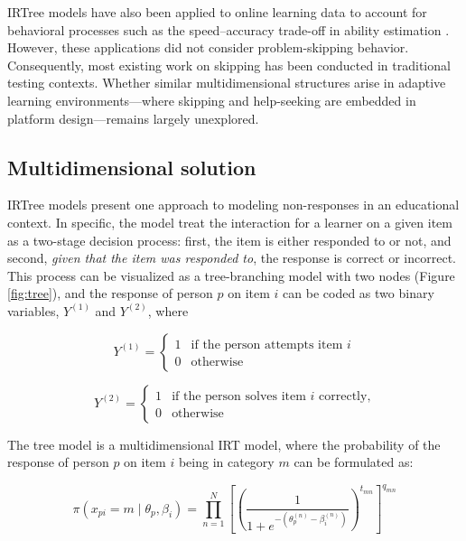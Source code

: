 \documentclass[12pt]{article}
\begin{document}
IRTree models have also been applied to online learning data to account for behavioral processes such as the speed–accuracy trade-off in ability estimation \parencite{coomans2016distinguishing, hofman2018fast}. However, these applications did not consider problem-skipping behavior. Consequently, most existing work on skipping has been conducted in traditional testing contexts. Whether similar multidimensional structures arise in adaptive learning environments---where skipping and help-seeking are embedded in platform design---remains largely unexplored. 

\subsection{Multidimensional solution}
IRTree models present one approach to modeling non-responses in an educational context. In specific, the model treat the interaction for a learner on a given item as a two-stage decision process: first, the item is either responded to or not, and second, \textit{given that the item was responded to}, the response is correct or incorrect. This process can be visualized as a tree-branching model with two nodes (Figure \ref{fig:tree}), and the response of person $p$ on item $i$ can be coded as two binary variables, $Y^{(1)}$ and $Y^{(2)}$, where 

\begin{equation}
Y^{(1)} =
\begin{cases} 
1 & \text{if the person attempts item } i \\
0 & \text{otherwise}
\end{cases}
\end{equation}

\begin{equation}
Y^{(2)} =
\begin{cases} 
1 & \text{if the person solves item } i \text{ correctly,} \\
0 & \text{otherwise}
\end{cases}
\label{eq:cases}
\end{equation}

The tree model is a multidimensional IRT model, where the probability of the response of person $p$ on item $i$ being in category $m$ can be formulated as: 

\begin{equation}
\pi(x_{pi} = m \mid \theta_p, \beta_i) = \prod_{n=1}^{N} \left[ \left( \frac{1}{1 + e^{-(\theta_p^{(n)} - \beta_i^{(n)})}} \right)^{t_{mn}} \right]^{q_{mn}}
\label{eq:tree}
\end{equation}
\end{document}
